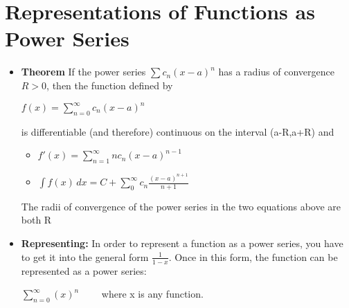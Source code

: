 \documentclass{report}
\begin{document}
	\section{Representations of Functions as Power Series}
		\begin{itemize}\addtolength{\leftskip}{2em}
			\item \textbf{Theorem} If the power series $\sum c_n(x-a)^n$ has a radius of convergence $R>0$, then the function defined by 
			\begin{center}
			$f(x)=\sum\limits_{n=0}^{\infty}c_n(x-a)^n$
			\end{center}
			\begin{center}
			is differentiable (and therefore) continuous on the interval (a-R,a+R) and
			\end{center}
			\begin{itemize}\addtolength{\leftskip}{6em}
				\item $f'(x)=\sum\limits_{n=1}^{\infty}nc_n(x-a)^{n-1}$
				\item $\int f(x)\,dx=C+\sum\limits_{0}^{\infty}c_n\frac{(x-a)^{n+1}}{n+1}$
			\end{itemize}
			\begin{center}
			The radii of convergence of the power series in the two equations above are both R
			\end{center}
			\item \textbf{Representing:} In order to represent a function as a power series, you have to get it into the general form $\frac{1}{1-x}$. Once in this form, the function can be represented as a power series:
			\begin{center}
			$\sum\limits_{n=0}^{\infty}(x)^n\quad\quad$ where x is any function.
			\end{center}
		\end{itemize}
		\newpage
\end{document}
